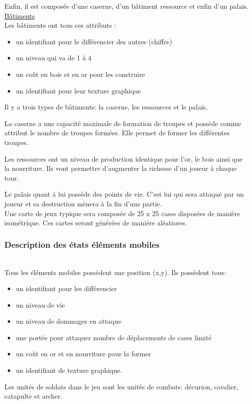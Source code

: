 \documentclass[12pt,a4paper]{article}
\begin{document}
Enfin, il est composée d'une caserne, d'un bâtiment ressource et enfin d'un palais. \\

\uline{Bâtiments}\\

Les bâtiments ont tous ces attributs :
\begin{itemize}
\item un identifiant pour le différencier des autres (chiffre)
\item un niveau qui va de 1 à 4
\item un coût en bois et en or pour les construire
\item un identifiant pour leur texture graphique
\end{itemize}

Il y a trois types de bâtiments: la caserne, les ressources et le palais.

La caserne a une capacité maximale de formation de troupes et possède comme attribut le nombre de troupes formées. Elle permet de former les différentes troupes.

Les ressources ont un niveau de production identique pour l'or, le bois ainsi que la nourriture. Ils vont permettre d'augmenter la richesse d'un joueur à chaque tour.

Le palais quant à lui possède des points de vie. C'est lui qui sera attaqué par un joueur et sa destruction mènera à la fin d'une partie.\\

Une carte de jeux typique sera composée de 25 x 25 cases disposées de manière isométrique. Ces cartes seront générées de manière aléatiores. 

\subsubsection{Description des états éléments mobiles}\\

Tous les éléments mobiles possèdent une position (x,y). 
Ils possèdent tous:
\begin{itemize}
\item un identifiant pour les différencier
\item un niveau de vie
\item un niveau de dommages en attaque
\item une portée pour attaquer
\itemun nombre de déplacements de cases limité
\item un coût en or et en nourriture pour la former
\item un identifiant de texture graphique.
\end{itemize}
Les unités de soldats dans le jeu sont les unités de combats: décurion, cavalier, catapulte et archer.\\
\end{document}
